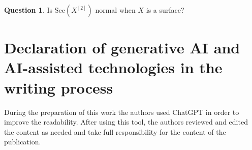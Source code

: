 \documentclass[a4paper]{amsart}
\numberwithin{equation}{section}
\theoremstyle{plain}
\theoremstyle{definition}
\newtheorem{ques}[thm]{Question}
\theoremstyle{remark}
\numberwithin{figure}{section}
\numberwithin{table}{section}
\numberwithin{equation}{section}
\begin{document}
\begin{ques}
    Is $\mathrm{Sec}(X^{[2]})$ normal when $X$ is a surface?
\end{ques}

\section{Declaration of generative AI and AI-assisted technologies in the writing process}

During the preparation of this work the authors used ChatGPT in order to improve the readability.
After using this tool, the authors reviewed and edited the content as needed and take full responsibility for the content of the publication.



\end{document}
